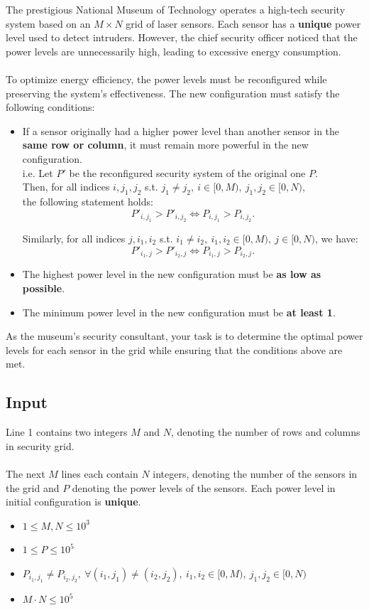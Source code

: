 \documentclass[12pt,a4paper]{article}
\begin{document}
\noindent
The prestigious National Museum of Technology operates a high-tech security system based on an \(M \times N\) grid of laser sensors. Each sensor has a \textbf{unique} power level used to detect intruders. However, the chief security officer noticed that the power levels are unnecessarily high, leading to excessive energy consumption.
\\\\
\noindent
To optimize energy efficiency, the power levels must be reconfigured while preserving the system's effectiveness. The new configuration must satisfy the following conditions:
\begin{itemize}
    \item If a sensor originally had a higher power level than another sensor in the \textbf{same row or column}, it must remain more powerful in the new configuration.\\
    i.e. Let \( P' \) be the reconfigured security system of the original one \( P \).\\
    Then, for all indices \( i, j_1, j_2 \) s.t. \( j_1 \ne j_2,\ i\in [0,M),\ j_1,j_2\in [0,N)\),\\ the following statement holds:
    \[
    P'_{i, j_1} > P'_{i, j_2} \iff P_{i, j_1} > P_{i, j_2}.
    \]
    
    Similarly, for all indices \( j, i_1, i_2 \) s.t. \( i_1 \ne i_2,\ i_1,i_2\in [0,M),\ j\in [0,N)\), we have:
    \[
    P'_{i_1, j} > P'_{i_2, j} \iff P_{i_1, j} > P_{i_2, j}.
    \]

    \item The highest power level in the new configuration must be \textbf{as low as possible}.
    \item The minimum power level in the new configuration must be \textbf{at least 1}.
\end{itemize}

\noindent
As the museum's security consultant, your task is to determine the optimal power levels for each sensor in the grid while ensuring that the conditions above are met.

\subsection*{\fontsize{16}{12}Input}
Line 1 contains two integers \(M\) and \(N\), denoting the number of rows and columns in security grid.
\\\\
\noindent
The next \(M\) lines each contain \(N\) integers, denoting the number of the sensors in the grid and $P$ denoting the power levels of the sensors. Each power level in initial configuration is \textbf{unique}.
\begin{itemize}
    \item \(1 \leq M, N \leq 10^3\)
    \item $1\leq P \leq 10^5$
    \item $P_{i_1, j_1} \neq P_{i_2, j_2}, \ \forall (i_1, j_1) \neq (i_2, j_2),\ i_1, i_2 \in [0, M),\ j_1, j_2 \in [0, N)$
    \item \(M \cdot N \leq 10^5\)
\end{itemize}
\end{document}
